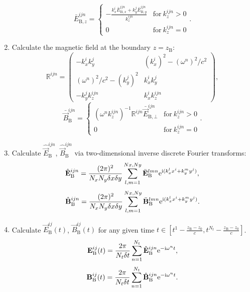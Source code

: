 \begin{enumerate}
\begin{equation}
	\bar{E}_{\mathrm{B}, z}^{ijn} = \begin{cases} -\frac{k_x^i \bar{E}_{\mathrm{B}, x}^{ijn} + k_y^j \bar{E}_{\mathrm{B}, y}^{ijn}}{k_z^{ijn}} & \text{for} \ k_z^{ijn} > 0 \\ 0 & \text{for} \ k_z^{ijn} = 0 \end{cases}.
	\end{equation}
	\item Calculate the magnetic field at the boundary $ z = z_\mathrm{B} $:
	\begingroup
	\renewcommand*{\arraystretch}{1.7}
	\begin{equation}
	\mathbb{R}^{ijn} =  \begin{pmatrix}
	-k_x^i k_y^j & (k_x^i)^2 - (\omega^n)^2/c^2 \\
	(\omega^n)^2/c^2 - (k_y^j)^2 & k_x^i k_y^j \\
	-k_y^j k_z^{ijn} & k_x^i k_z^{ijn} 
	\end{pmatrix},
	\end{equation} 
	\endgroup
	\begin{equation}
	\bar{\vec{B}}_{\mathrm{B}}^{ijn} = \begin{cases} (\omega^n k_z^{ijn})^{-1} \mathbb{R}^{ijn} \bar{\vec{E}}_{\mathrm{B}, \bot}^{ijn} & \text{for} \ k_z^{ijn} > 0 \\ 0 & \text{for} \ k_z^{ijn} = 0 \end{cases}.
	\end{equation}
	\item Calculate $ \hat{\vec{E}}_{\mathrm{B}}^{ijn} $, $ \hat{\vec{B}}_{\mathrm{B}}^{ijn} $ via two-dimensional inverse discrete Fourier transforms:
	\begin{equation}
	\hat{\mathbf{E}}_{\mathrm{B}}^{ijn} = \frac{(2 \pi)^2}{N_x N_y \delta x \delta y} \sum_{l, m = 1}^{Nx, Ny} \bar{\mathbf{E}}_{\mathrm{B}}^{lmn} \mathrm{e}^{\mathrm{i}(k_x^l x^i + k_y^m y^j)},
	\end{equation}
	\begin{equation}
	\hat{\mathbf{B}}_{\mathrm{B}}^{ijn} = \frac{(2 \pi)^2}{N_x N_y \delta x \delta y}  \sum_{l, m = 1}^{Nx, Ny} \bar{\mathbf{B}}_{\mathrm{B}}^{lmn} \mathrm{e}^{\mathrm{i}(k_x^l x^i + k_y^m y^j)}.
	\end{equation}
	\item Calculate $ \vec{E}_{\mathrm{B}}^{ij}(t) $, $ \vec{B}_{\mathrm{B}}^{ij}(t) $ for any given time $ t \in [t^{1} - \frac{z_{\mathrm{B}} - z_{0}}{c}, t^{N_{t}}  - \frac{z_{\mathrm{B}} - z_{0}}{c}] $.
	\begin{equation}
	\mathbf{E}_{\mathrm{B}}^{ij} (t) = \frac{2 \pi}{N_t \delta t} \sum_{n = 1}^{N_t} \hat{\mathbf{E}}_{\mathrm{B}}^{ijn} \mathrm{e}^{-\mathrm{i} \omega^n t},
	\end{equation}
	\begin{equation}
	\mathbf{B}_{\mathrm{B}}^{ij} (t) = \frac{2 \pi}{N_t \delta t} \sum_{n = 1}^{N_t} \hat{\mathbf{B}}_{\mathrm{B}}^{ijn} \mathrm{e}^{-\mathrm{i} \omega^n t}.
	\end{equation}
\end{enumerate}

